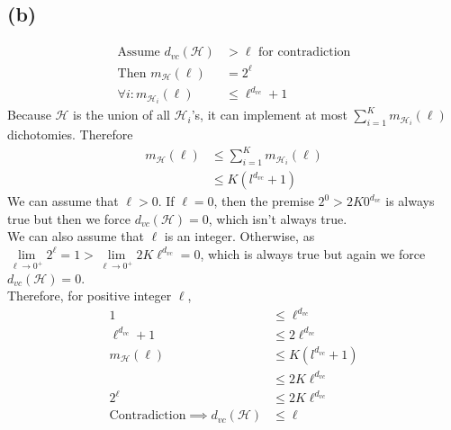 \documentclass{article}
\begin{document}
	\subsection*{(b)}
		\begin{align*}
			\text{Assume }d_{vc}(\mathcal H) &> \ell \text{ for contradiction}\\
			\text{Then } m_{\mathcal H}(\ell) &= 2^\ell\\
			\forall i: m_{\mathcal H_i}(\ell) &\leq \ell^{d_{vc}} + 1
		\end{align*}
		Because $\mathcal H$ is the union of all $\mathcal H_i$'s, it can implement at most $\sum\limits_{i=1}^K m_{\mathcal H_i}(\ell)$ dichotomies. Therefore
		\begin{align*}
			m_\mathcal H(\ell) &\leq \sum\limits_{i=1}^K m_{\mathcal H_i}(\ell)\\
			&\leq K(l^{d_{vc}} + 1)
		\end{align*}
		We can assume that $\ell > 0$. If $\ell = 0$, then the premise $2^0 > 2K0^{d_{vc}}$ is always true but then we force $d_{vc}(\mathcal H) = 0$, which isn't always true.\\
		We can also assume that $\ell$ is an integer. Otherwise, as $\lim\limits_{\ell \rightarrow 0^+} 2^\ell = 1 > \lim\limits_{\ell \rightarrow 0^+} 2K\ell^{d_{vc}} = 0$, which is always true but again we force $d_{vc}(\mathcal H) = 0$.\\
		Therefore, for positive integer $\ell$,
		\begin{align*}
			1 &\leq \ell^{d_{vc}}\\
			\ell^{d_{vc}}+1 &\leq 2\ell^{d_{vc}}\\
			m_{\mathcal H}(\ell) &\leq K(l^{d_{vc}} + 1)\\
			&\leq 2K\ell^{d_{vc}}\\
			2^\ell&\leq 2K\ell^{d_{vc}}\\
			\text{Contradiction} \implies d_{vc}(\mathcal H) &\leq \ell
		\end{align*}
	
\end{document}
